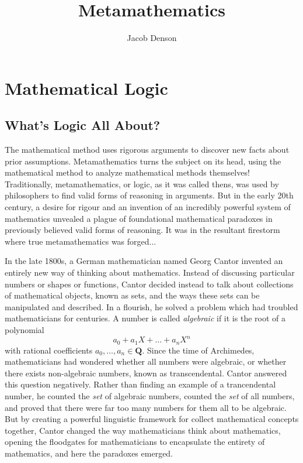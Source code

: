 

\title{Metamathematics}
\author{Jacob Denson}



\maketitle
\tableofcontents

\part{Mathematical Logic}

\chapter{What's Logic All About?}


The mathematical method uses rigorous arguments to discover new facts about prior assumptions. Metamathematics turns the subject on its head, using the mathematical method to analyze mathematical methods themselves! Traditionally, metamathematics, or logic, as it was called thens, was used by philosophers to find valid forms of reasoning in arguments. But in the early 20th century, a desire for rigour and an invention of an incredibly powerful system of mathematics unvealed a plague of foundational mathematical paradoxes in previously believed valid forms of reasoning. It was in the resultant firestorm where true metamathematics was forged...

In the late 1800s, a German mathematician named Georg Cantor invented an entirely new way of thinking about mathematics. Instead of discussing particular numbers or shapes or functions, Cantor decided instead to talk about collections of mathematical objects, known as sets, and the ways these sets can be manipulated and described. In a flourish, he solved a problem which had troubled mathematicians for centuries. A number is called {\it algebraic} if it is the root of a polynomial
%
\[ a_0 + a_1 X + \dots + a_n X^n \]
%
with rational coefficients $a_0, \dots, a_n \in \mathbf{Q}$.  Since the time of Archimedes, mathematicians had wondered whether all numbers were algebraic, or whether there exists non-algebraic numbers, known as transcendental. Cantor answered this question negatively. Rather than finding an example of a trancendental number, he counted the {\it set} of algebraic numbers, counted the {\it set} of all numbers, and proved that there were far too many numbers for them all to be algebraic. But by creating a powerful linguistic framework for collect mathematical concepts together, Cantor changed the way mathematicians think about mathematics, opening the floodgates for mathematicians to encapsulate the entirety of mathematics, and here the paradoxes emerged.

